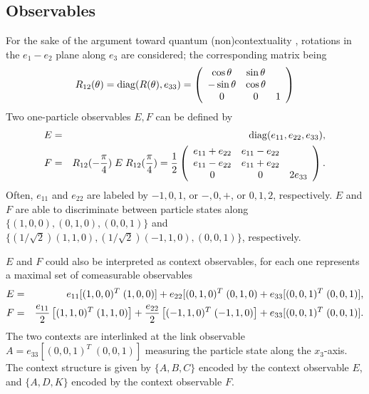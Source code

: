 \documentclass[pra,preprint,showpacs,showkeys,amsfonts]{revtex4}
\begin{document}
\subsection{Observables}
\label{2004-analog-2p3sb}
For the sake of the argument toward quantum (non)contextuality
\cite{svozil-2004-qnc}, rotations in the $e_1-e_2$ plane along $e_3$ are considered;
the corresponding matrix being
\begin{equation}
R_{12}(\theta ) =  {\rm diag}(R(\theta ),e_{33}) =
\left(
\begin{array}{cccc}
\cos \theta &\sin \theta & \\
-\sin \theta &\cos \theta &\\
0&0&1
\end{array}
\right)
\end{equation}
Two one-particle observables $E,F$ can be defined by
\begin{eqnarray}
E &=&
{\rm diag}(e_{11},e_{22},e_{33}),
\label{2004-analog-Epiover43p}
\\
F &=& R_{12}(-{\pi \over 4})\; E \; R_{12}({\pi \over 4})
=
{1\over {2}}\left(
\begin{array}{cccc}
e_{11}+e_{22}&e_{11}-e_{22}&\\
e_{11}-e_{22}&e_{11}+e_{22}&\\
0&0&2 e_{33}
\end{array}
\right) .
\label{2004-analog-Epiover4b3p}
\end{eqnarray}
Often,
$e_{11}$
and
$e_{22}$
are  labeled by $-1,0,1$, or $-,0,+$, or $0,1,2$, respectively.
$E$ and $F$ are able to discriminate between particle states along
$\{(1,0,0),(0,1,0),(0,0,1)\}$
and
$\{(1/\sqrt{2})(1,1,0),(1/\sqrt{2})(-1,1,0),(0,0,1)\}$,
respectively.

$E$ and $F$ could also be interpreted as  context observables,
for each one represents a maximal set of comeasurable observables
\begin{eqnarray}
E &=&  e_{11}[(1,0,0)^T\;(1,0,0)] + e_{22}[(0,1,0)^T\;(0,1,0) + e_{33}[(0,0,1)^T\;(0,0,1)],
\label{2004-analog-Epiover4c3}
\\
F &=&  {e_{11}\over 2}\left[(1,1,0)^T\; (1,1,0)\right]
+ {e_{22}\over 2}\left[(-1,1,0)^T\;(-1,1,0)\right]  + e_{33}[(0,0,1)^T\;(0,0,1)].
\label{2004-analog-Epiover4bc3}
\end{eqnarray}
The two contexts are  interlinked at the link observable $A = e_{33}[(0,0,1)^T\;(0,0,1)]$
measuring the particle state along the $x_3$-axis.
The context structure is given by $\{A,B,C\}$ encoded by the context observable $E$,
and $\{A,D,K\}$ encoded by the context observable $F$.
\end{document}
